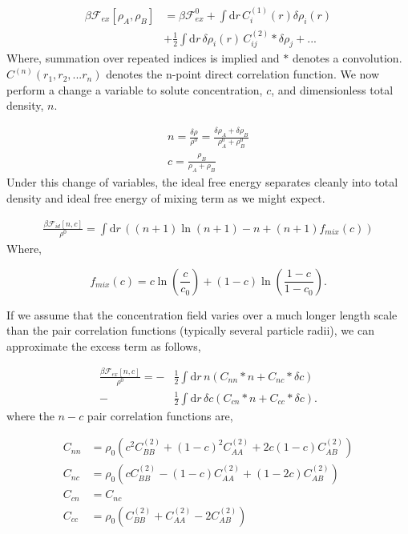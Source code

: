 \documentclass[showkeys, prb, reprint]{revtex4-1}
\newcommand{\F}{\mathcal{F}}
\newcommand{\A}{\rho_A}
\newcommand{\B}{\rho_B}
\newcommand{\dd}{\mathrm{d}}
\renewcommand{\d}{\delta}
\renewcommand{\l}{\left}
\renewcommand{\r}{\right}
\newcommand{\f}{\frac}
\begin{document}
\begin{align}
	\beta\F_{ex}[\A, \B]  &= \beta \F_{ex}^0 + \int \dd r \, C_i^{(1)}(r) \d \rho_i(r) \\
		&+ \f{1}{2}\int \dd r\, \d \rho_i(r) \,C^{(2)}_{ij} \ast \d\rho_j  + ... \nonumber
\end{align}
Where, summation over repeated indices is implied and $\ast$ denotes a convolution. $C^{(n)}(r_1, r_2, ...r_n)$ denotes the n-point direct correlation function. We now perform a change a variable to solute concentration, $c$, and dimensionless total density, $n$.

\begin{gather}
	n = \f{\delta \rho}{\rho^0} = \f{\d \A + \d \B}{\A^0 + \B^0} \\
	c = \f{\B}{\A + \B}
\end{gather}
Under this change of variables, the ideal free energy separates cleanly into total density and ideal free energy of mixing term as we might expect.

\begin{gather}
	\f{\beta\F_{id}[n, c]}{\rho^0} = \int \dd r\, \l( \l(n + 1\r) \ln\l(n + 1\r) - n  
	 + \l(n + 1 \r) f_{mix}(c) \r)
\end{gather}
Where,

\begin{equation}
  f_{mix}(c) = c\ln\l(\f{c}{c_0}\r) + (1 - c)\ln\l(\f{1 - c}{1 - c_0}\r).
\end{equation}

If we assume that the concentration field varies over a much longer length scale than the pair correlation functions (typically several particle radii), we can approximate the excess term as follows,

\begin{align}
	\f{\beta \F_{ex}[n, c]}{\rho^0} = -&\f{1}{2} \int \dd r\, n \l( C_{nn} \ast n + C_{nc} \ast \d c\r) \nonumber \\
	- &\f{1}{2} \int\dd r\, \d c \l( C_{cn} \ast n + C_{cc} \ast \d c\r).
\end{align}
where the $n-c$ pair correlation functions are,

\begin{align}
	C_{nn} &= \rho_0 \l(c^2 C_{BB}^{(2)} + (1 - c)^2 C_{AA}^{(2)} + 2c\l(1 - c\r) C_{AB}^{(2)} \r) \\
	C_{nc} &= \rho_0 \l(c C_{BB}^{(2)} - (1-c)C_{AA}^{(2)} + (1 - 2c) C_{AB}^{(2)} \r)\\
	C_{cn} &= C_{nc} \\
	C_{cc} &= \rho_0 \l(C_{BB}^{(2)} + C_{AA}^{(2)} - 2C_{AB}^{(2)} \r)
\end{align}
\end{document}
